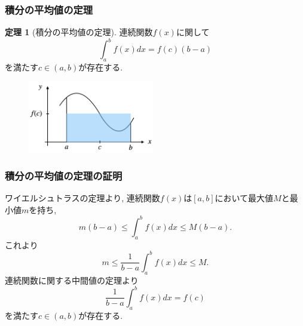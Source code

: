 \documentclass[dvipdfmx,cjk,10.2pt]{beamer}
\theoremstyle{definition}
\newtheorem{Thm}{定理}[section]
\begin{document}


\begin{frame}
\frametitle{積分の平均値の定理}


\begin{Thm}[積分の平均値の定理]
連続関数$f(x)$に関して
$$
\int_a^b f(x)dx = f(c)(b-a)
$$
を満たす$c \in (a,b)$が存在する. 
\end{Thm}

\begin{figure}[htbp]
 \begin{center} 
  \includegraphics[width=55mm]{MeanValueInt.png}
 \end{center}
\end{figure}

\end{frame}




\begin{frame}
\frametitle{積分の平均値の定理の証明}

ワイエルシュトラスの定理より, 連続関数$f(x)$は$[a,b]$において最大値$M$と最小値$m$を持ち, 
$$
m(b-a) \le \int_a^b f(x)dx \le M(b-a). 
$$
これより
$$
m \le \frac{1}{b-a}\int_a^b f(x)dx \le M.  
$$
連続関数に関する中間値の定理より
$$
\frac{1}{b-a}\int_a^b f(x)dx = f(c)
$$
を満たす$c \in (a,b)$が存在する. 


\end{frame}




\end{document}
